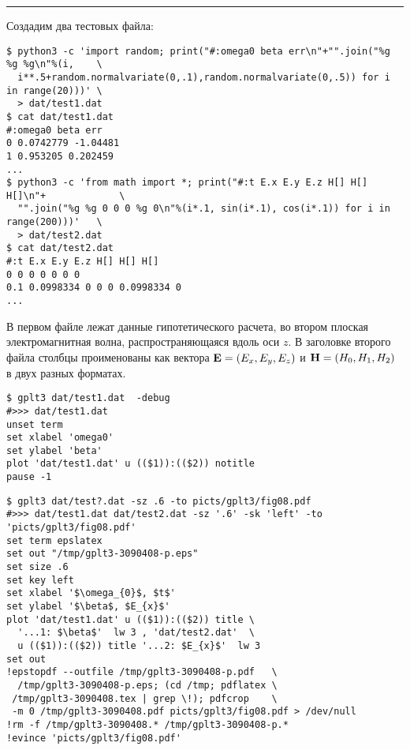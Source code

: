 \documentclass[12pt]{article}
\begin{document}
\hrule %

\vspace{3mm}
Создадим два тестовых файла:
{\small
\begin{verbatim}
$ python3 -c 'import random; print("#:omega0 beta err\n"+"".join("%g %g %g\n"%(i,    \
  i**.5+random.normalvariate(0,.1),random.normalvariate(0,.5)) for i in range(20)))' \
  > dat/test1.dat
$ cat dat/test1.dat
#:omega0 beta err
0 0.0742779 -1.04481
1 0.953205 0.202459
...
$ python3 -c 'from math import *; print("#:t E.x E.y E.z H[] H[] H[]\n"+             \
  "".join("%g %g 0 0 0 %g 0\n"%(i*.1, sin(i*.1), cos(i*.1)) for i in range(200)))'   \
  > dat/test2.dat
$ cat dat/test2.dat
#:t E.x E.y E.z H[] H[] H[]
0 0 0 0 0 0 0
0.1 0.0998334 0 0 0 0.0998334 0
...
\end{verbatim}
}
В первом файле лежат данные гипотетического расчета, во втором плоская электромагнитная волна, распространяющаяся
вдоль оси $z$. В заголовке второго файла столбцы проименованы как вектора ${\bf E}=(E_x, E_y, E_z)$ и ${\bf H}=(H_0, H_1, H_2)$ в двух разных форматах.\\

\noindent
\begin{minipage}[b]{.69\textwidth}
  \small
\begin{verbatim}
$ gplt3 dat/test1.dat  -debug
#>>> dat/test1.dat
unset term
set xlabel 'omega0'
set ylabel 'beta'
plot 'dat/test1.dat' u (($1)):(($2)) notitle   
pause -1
\end{verbatim}
\end{minipage}

\noindent
\begin{minipage}[b]{.54\textwidth}
  \small
\begin{verbatim}
$ gplt3 dat/test?.dat -sz .6 -to picts/gplt3/fig08.pdf
#>>> dat/test1.dat dat/test2.dat -sz '.6' -sk 'left' -to 'picts/gplt3/fig08.pdf'
set term epslatex 
set out "/tmp/gplt3-3090408-p.eps"
set size .6
set key left
set xlabel '$\omega_{0}$, $t$'
set ylabel '$\beta$, $E_{x}$'
plot 'dat/test1.dat' u (($1)):(($2)) title \
  '...1: $\beta$'  lw 3 , 'dat/test2.dat'  \
  u (($1)):(($2)) title '...2: $E_{x}$'  lw 3 
set out
!epstopdf --outfile /tmp/gplt3-3090408-p.pdf   \
  /tmp/gplt3-3090408-p.eps; (cd /tmp; pdflatex \
 /tmp/gplt3-3090408.tex | grep \!); pdfcrop    \
 -m 0 /tmp/gplt3-3090408.pdf picts/gplt3/fig08.pdf > /dev/null
!rm -f /tmp/gplt3-3090408.* /tmp/gplt3-3090408-p.*
!evince 'picts/gplt3/fig08.pdf'
\end{verbatim}
\end{minipage}
\end{document}

